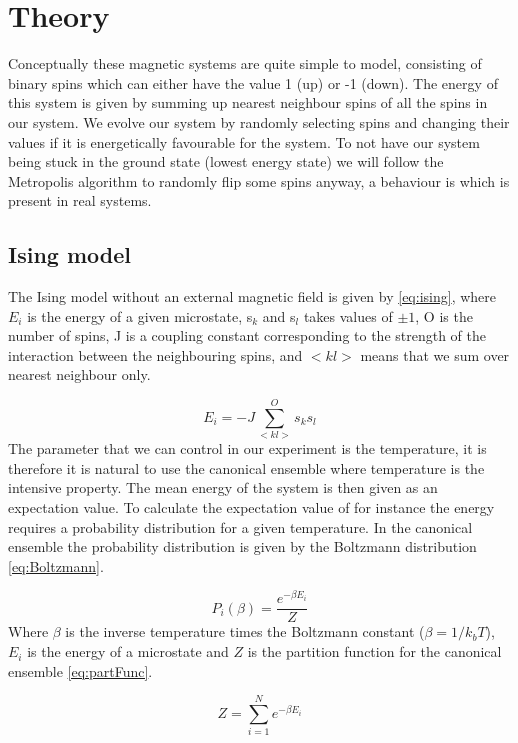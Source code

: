 \section{Theory}

Conceptually these magnetic systems are quite simple to model,
consisting of binary spins which can either have the value 1 (up) or -1 (down).
The energy of this system is given by summing up nearest neighbour spins of all
the spins in our system. We evolve our system by randomly selecting spins and
changing their values if it is energetically favourable for the system. To not
have our system being stuck in the ground state (lowest energy state) we will
follow the Metropolis algorithm to randomly flip some spins anyway, a
behaviour is which is present in real systems.


\subsection{Ising model}
The Ising model without an external magnetic field is given by
\cref{eq:ising}, where $E_i$ is the energy of a given microstate, s$_k$ and s$_l$ takes values of $\pm 1$, O is the
number of spins, J is a coupling constant corresponding to the strength of the
interaction between the neighbouring spins, and $<kl>$ means that we sum over
nearest neighbour only.

\begin{equation}\label{eq:ising}
  E_i = -J\sum_{<kl>}^{O} s_k s_l
\end{equation}
The parameter that we can control in our experiment is the temperature, it
is therefore it is natural to
use the canonical ensemble where temperature is the intensive property. The
mean energy of the system is then given as an expectation value. To calculate
the expectation value of for instance the energy requires a probability
distribution for a given temperature. In the canonical ensemble the probability
distribution is given by the Boltzmann distribution \cref{eq:Boltzmann}.

\begin{equation}\label{eq:Boltzmann}
  P_i(\beta) = \frac{e^{-\beta E_i}}{Z}
\end{equation}
Where $\beta$ is the inverse temperature times the Boltzmann constant
($\beta = 1/k_bT $),  $E_i$ is the energy of a microstate and $Z$
 is the partition function for the canonical ensemble \cref{eq:partFunc}.

\begin{equation}\label{eq:partFunc}
  Z = \sum_{i=1}^{N} e^{-\beta E_i}
\end{equation}


